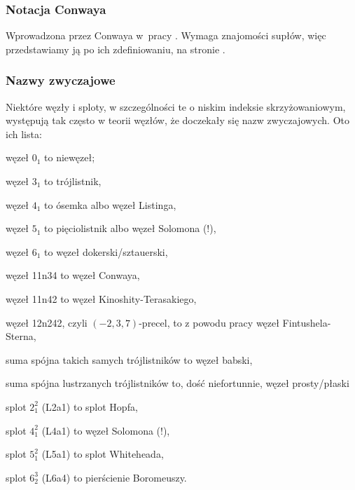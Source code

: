 %

\subsubsection{Notacja Conwaya}
%
Wprowadzona przez Conwaya w~pracy \cite{conway1970}.
Wymaga znajomości supłów, więc przedstawiamy ją po ich zdefiniowaniu, na stronie \pageref{conway_notation}.

\subsubsection{Nazwy zwyczajowe}
\label{sssec:link_names}%
Niektóre węzły i sploty, w szczególności te o niskim indeksie skrzyżowaniowym, występują tak często w teorii węzłów, że doczekały się nazw zwyczajowych.
Oto ich lista:
\begin{compactitem}
    \item węzeł $0_1$ to niewęzeł;
%
    \item węzeł $3_1$ to trójlistnik,
%
    \item węzeł $4_1$ to ósemka albo węzeł Listinga,
%
    \item węzeł $5_1$ to pięciolistnik albo węzeł Solomona (!),
%
%
    \item węzeł $6_1$ to węzeł dokerski/sztauerski,
%
    \item węzeł 11n34 to węzeł Conwaya,
%
    \item węzeł 11n42 to węzeł Kinoshity-Terasakiego,
%
    \item węzeł 12n242, czyli $(-2, 3, 7)$-precel, to z powodu pracy \cite{fintushel1980} węzeł  Fintushela-Sterna,
%
%
%
    \item suma spójna takich samych trójlistników to węzeł babski,
    \item suma spójna lustrzanych trójlistników to, dość niefortunnie, węzeł prosty/płaski %
    \item splot $2_1^2$ (L2a1) to splot Hopfa,
%
    \item splot $4_1^2$ (L4a1) to węzeł Solomona (!),
%
    \item splot $5_1^2$ (L5a1) to splot Whiteheada,
%
    \item splot $6_2^3$ (L6a4) to pierścienie Boromeuszy.
%
\end{compactitem}

